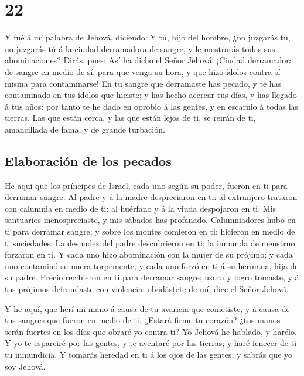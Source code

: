 \hypertarget{section-21}{%
\section{22}\label{section-21}}

 Y fué á mí palabra de Jehová, diciendo:  Y tú,
hijo del hombre, ¿no juzgarás tú, no juzgarás tú á la ciudad derramadora
de sangre, y le mostrarás todas sus abominaciones?  Dirás,
pues: Así ha dicho el Señor Jehová: ¡Ciudad derramadora de sangre en
medio de sí, para que venga su hora, y que hizo ídolos contra sí misma
para contaminarse!  En tu sangre que derramaste has pecado,
y te has contaminado en tus ídolos que hiciste; y has hecho acercar tus
días, y has llegado á tus años: por tanto te he dado en oprobio á las
gentes, y en escarnio á todas las tierras.  Las que están
cerca, y las que están lejos de ti, se reirán de ti, amancillada de
fama, y de grande turbación.

\hypertarget{elaboraciuxf3n-de-los-pecados}{%
\subsection{Elaboración de los
pecados}\label{elaboraciuxf3n-de-los-pecados}}

 He aquí que los príncipes de Israel, cada uno según su
poder, fueron en ti para derramar sangre.  Al padre y á la
madre despreciaron en ti: al extranjero trataron con calumnia en medio
de ti: al huérfano y á la viuda despojaron en ti.  Mis
santuarios menospreciaste, y mis sábados has profanado. 
Calumniadores hubo en ti para derramar sangre; y sobre los montes
comieron en ti: hicieron en medio de ti suciedades.  La
desnudez del padre descubrieron en ti; la inmunda de menstruo forzaron
en ti.  Y cada uno hizo abominación con la mujer de su
prójimo; y cada uno contaminó su nuera torpemente; y cada uno forzó en
ti á su hermana, hija de su padre.  Precio recibieron en ti
para derramar sangre; usura y logro tomaste, y á tus prójimos
defraudaste con violencia: olvidástete de mí, dice el Señor Jehová.

 Y he aquí, que herí mi mano á causa de tu avaricia que
cometiste, y á causa de tus sangres que fueron en medio de ti.
 ¿Estará firme tu corazón? ¿tus manos serán fuertes en los
días que obraré yo contra ti? Yo Jehová he hablado, y harélo.
 Y yo te esparciré por las gentes, y te aventaré por las
tierras; y haré fenecer de ti tu inmundicia.  Y tomarás
heredad en ti á los ojos de las gentes; y sabrás que yo soy Jehová.

